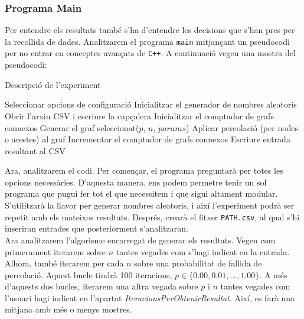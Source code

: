\documentclass[a4paper]{article}
\begin{document}
	\subsubsection{Programa Main}
	
	Per entendre els resultats també s'ha d'entendre les decisions que s'han pres per la recollida de dades. Analitzarem el programa \texttt{main} mitjançant un pseudocodi per no entrar en conceptes avançats de \texttt{C++}. A continuació vegeu una mostra del pseudocodi: \\
	
	\begin{algorithm} [H]
		\caption{Descripció de l'experiment}
		\begin{algorithmic}[1]
			\State Seleccionar opcions de configuració
			\State Inicialitzar el generador de nombres aleatoris
			\State Obrir l'arxiu CSV i escriure la capçalera
			\State Inicialitzar el comptador de grafs connexos
			\Repeat
			\State Generar el graf seleccionat($p$, $n$, $params$)
			\State Aplicar percolació (per nodes o arestes) al graf
			\State Incrementar el comptador de grafs connexos
			\EndIf
			\EndFor
			\State Escriure entrada resultant al CSV
			\EndFor
			\EndFor
		\end{algorithmic}
	\end{algorithm}
	
	Ara, analitzarem el codi. Per començar, el programa preguntarà per totes les opcions necessàries. D'aquesta manera, ens podem permetre tenir un sol programa que pugui fer tot el que necessitem i que sigui altament modular. S'utilitzarà la llavor per generar nombres aleatoris, i així l'experiment podrà ser repetit amb els mateixos resultats. Després, crearà el fitxer \texttt{PATH.csv}, al qual s'hi inseriran entrades que posteriorment s'analitzaran. \\
	
	Ara analitzarem l'algorisme encarregat de generar els resultats. Vegeu com primerament iterarem sobre $n$ tantes vegades com s'hagi indicat en la entrada. Alhora, també iterarem per cada $n$ sobre una probabilitat de fallida de percolació. Aquest bucle tindrà 100 iteracions, $p \in \{0.00, 0.01, \dots, 1.00\}$. A més d'aquests dos bucles, iterarem una altra vegada sobre $p$ i $n$ tantes vegades com l'usuari hagi indicat en l'apartat \textit{IteracionsPerObtenirResultat}. Així, es farà una mitjana amb més o menys mostres. \\
	
\end{document}
